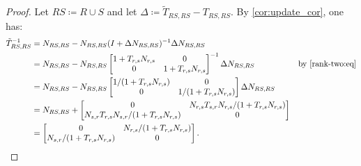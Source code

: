 \begin{proof}
  Let \(RS \coloneqq R \cup S\) and let \(\Delta \coloneqq \tilde{T}_{RS, RS} - T_{RS, RS}\).
By \cref{cor:update_cor}, one has:
\begin{align*}
  \tilde{T}^{-1}_{RS, RS} &= N_{RS, RS} - N_{RS, RS} (I + \Delta N_{RS, RS})^{-1} \Delta N_{RS, RS} & \\
                          &= N_{RS, RS} - N_{RS, RS} \begin{bmatrix} 1 + T_{r, s} N_{r, s} & 0 \\ 0 & 1 + T_{r, s} N_{r, s} \end{bmatrix}^{-1} \Delta N_{RS, RS} & \text{by \eqref{rank-two:eq}} \\
                     &= N_{RS, RS} - N_{RS, RS} \begin{bmatrix} 1 / (1 + T_{r, s} N_{r, s}) & 0 \\ 0 & 1 / (1 + T_{r, s} N_{r, s}) \end{bmatrix} \Delta N_{RS, RS} &\\
                     &= N_{RS, RS} + \begin{bmatrix} 0 & N_{r, s}T_{s, r}N_{r, s} / (1 + T_{r, s} N_{r, s}) \\ N_{s, r}T_{r, s}N_{s, r} /  (1 + T_{r, s} N_{r, s}) & 0 \end{bmatrix} & \\
                     &= \begin{bmatrix} 0 & N_{r, s} / (1 + T_{r, s} N_{r, s}) \\ N_{s, r} / (1 + T_{r, s} N_{r, s}) & 0 \end{bmatrix}. & \qedhere
\end{align*}
\end{proof}

